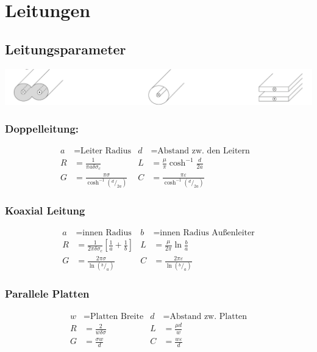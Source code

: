 \section{Leitungen}

\subsection{Leitungsparameter}


\includegraphics[width=\columnwidth]{Figures/Leitungsparameter.png}


\subsubsection{Doppelleitung:}
\begin{align*}
    a & = \text{Leiter Radius}                   & d & = \text{Abstand zw. den Leitern}                \\
    R & = \frac{1}{\pi a\delta\sigma_c}          & L & = \frac{\mu}{\pi} \cosh^{-1}\frac{d}{2a}      & \\
    G & = \frac{\pi\sigma}{\cosh^{-1}(^d/_{2a})} & C & = \frac{\pi\varepsilon}{\cosh^{-1}(^d/_{2a})}
\end{align*}

\subsubsection{Koaxial Leitung}
\begin{align*}
    a & = \text{innen Radius}                                              & b & = \text{innen Radius Außenleiter}               \\
    R & = \frac{1}{2\pi\delta\sigma_c}\left[\frac{1}{a}+\frac{1}{b}\right] & L & = \frac{\mu}{2\pi} \ln\frac{b}{a}     \\
    G & = \frac{2\pi\sigma}{\ln (^b/_a)}                                   & C & = \frac{2\pi\varepsilon}{\ln (^b/_a)}
\end{align*}

\subsubsection{Parallele Platten}
\begin{align*}
    w & = \text{Platten Breite}   & d & = \text{Abstand zw. Platten} \\
    R & = \frac{2}{w\delta\sigma} & L & = \frac{\mu d}{w}            \\
    G & = \frac{\sigma w}{d}      & C & = \frac{w\varepsilon}{d}
\end{align*}

